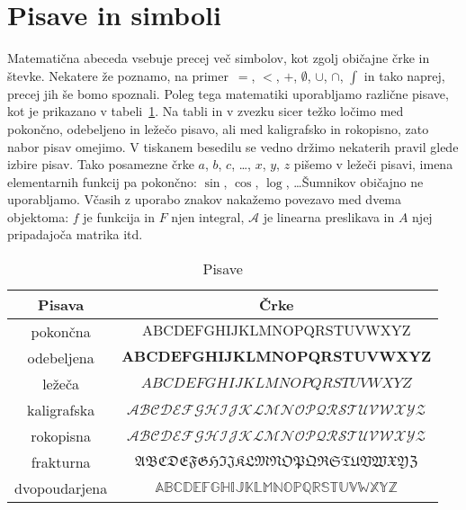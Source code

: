 


\section{Pisave in simboli}
\label{sec:pisave-in-simboli}

Matematična abeceda vsebuje precej več simbolov, kot zgolj običajne črke in števke. Nekatere že poznamo, na primer~$=$, $<$, $+$, $\emptyset$, $\cup$, $\cap$, $\int$ in tako naprej, precej jih še bomo spoznali. Poleg tega matematiki uporabljamo različne pisave, kot je prikazano v tabeli~\ref{tabela:oblike-crk}. Na tabli in v zvezku sicer težko ločimo med pokončno, odebeljeno in ležečo pisavo, ali med kaligrafsko in rokopisno, zato nabor pisav omejimo. V tiskanem besedilu se vedno držimo nekaterih pravil glede izbire pisav. Tako posamezne črke $a$, $b$, $c$, \ldots, $x$, $y$, $z$ pišemo v ležeči pisavi, imena elementarnih funkcij pa pokončno: $\sin$, $\cos$, $\log$, \ldots Šumnikov običajno ne uporabljamo. Včasih z uporabo znakov nakažemo povezavo med dvema objektoma: $f$ je funkcija in $F$ njen integral, $\mathcal{A}$ je linearna preslikava in $A$ njej pripadajoča matrika itd.

\begin{table}[ht]
\centering
\begin{tabular}{c|c}
\textbf{Pisava} & \textbf{Črke} \\
\hline
pokončna & $\mathrm{ABCDEFGHIJKLMNOPQRSTUVWXYZ}$ \\
odebeljena & $\mathbf{ABCDEFGHIJKLMNOPQRSTUVWXYZ}$ \\
ležeča & $ABCDEFGHIJKLMNOPQRSTUVWXYZ$ \\
kaligrafska & $\mathcal{ABCDEFGHIJKLMNOPQRSTUVWXYZ}$ \\
rokopisna & $\mathscr{ABCDEFGHIJKLMNOPQRSTUVWXYZ}$ \\
frakturna & $\mathfrak{ABCDEFGHIJKLMNOPQRSTUVWXYZ}$ \\
dvopoudarjena & $\mathbb{ABCDEFGHIJKLMNOPQRSTUVWXYZ}$
\end{tabular}
\caption{Pisave}\label{tabela:oblike-crk}
\end{table}

